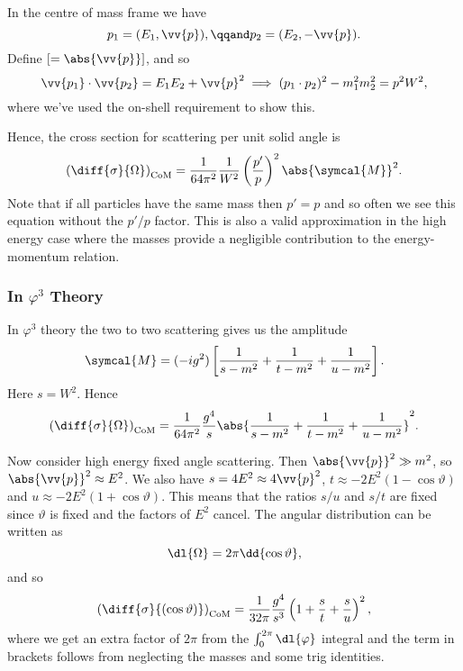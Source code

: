 \documentclass[fleqn]{NotesClass}
\newcommand{\amplitude}{\symcal{M}}
\begin{document}
    In the centre of mass frame we have
    \begin{equation}
        p_1 = (E_1, \vv{p}), \qqand p_2 = (E_2, -\vv{p}).
    \end{equation}
    Define \([ = \abs{\vv{p}}]\), and so
    \begin{equation}
        \vv{p_1} \cdot \vv{p_2} = E_1E_2 + \vv{p}^2 \implies (p_1 \cdot p_2)^2 - m_1^2 m_2^2 = p^2W^2,
    \end{equation}
    where we've used the on-shell requirement to show this.
    
    Hence, the cross section for scattering per unit solid angle is
    \begin{equation}
        \left( \diff{\sigma}{\Omega} \right)_{\text{CoM}} = \frac{1}{64\pi^2} \frac{1}{W^2} \left( \frac{p'}{p} \right)^2 \abs{\amplitude}^2.
    \end{equation}
    Note that if all particles have the same mass then \(p' = p\) and so often we see this equation without the \(p'/p\) factor.
    This is also a valid approximation in the high energy case where the masses provide a negligible contribution to the energy-momentum relation.
    
    \subsubsection{In \texorpdfstring{\(\varphi^3\)}{Phi Cubed} Theory}
    In \(\varphi^3\) theory the two to two scattering gives us the amplitude
    \begin{equation}
        \amplitude = (-ig^2) \left[ \frac{1}{s - m^2} + \frac{1}{t - m^2} + \frac{1}{u - m^2} \right].
    \end{equation}
    Here \(s = W^2\).
    Hence
    \begin{equation}
        \left( \diff{\sigma}{\Omega} \right)_{\text{CoM}} = \frac{1}{64\pi^2} \frac{g^4}{s} \abs{\frac{1}{s - m^2} + \frac{1}{t - m^2} + \frac{1}{u - m^2}}^2.
    \end{equation}
    
    Now consider high energy fixed angle scattering.
    Then \(\abs{\vv{p}}^2 \gg m^2\), so \(\abs{\vv{p}}^2 \approx E^2\).
    We also have \(s = 4E^2 \approx 4\vv{p}^2\), \(t \approx -2E^2(1 - \cos\vartheta)\) and \(u \approx -2E^2(1 + \cos\vartheta)\).
    This means that the ratios \(s/u\) and \(s/t\) are fixed since \(\vartheta\) is fixed and the factors of \(E^2\) cancel.
    The angular distribution can be written as
    \begin{equation}
        \dl{\Omega} = 2\pi \dd{\cos \vartheta},
    \end{equation}
    and so
    \begin{equation}
        \left( \diff{\sigma}{(\cos \vartheta)} \right)_{\text{CoM}} = \frac{1}{32\pi} \frac{g^4}{s^3}\left( 1 + \frac{s}{t} + \frac{s}{u} \right)^2,
    \end{equation}
    where we get an extra factor of \(2\pi\) from the \(\int_0^{2\pi}\dl{\varphi}\) integral and the term in brackets follows from neglecting the masses and some trig identities.
    
\end{document}
